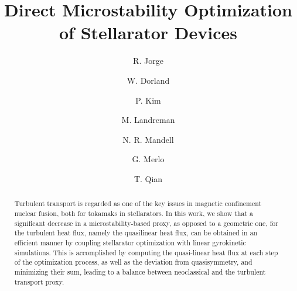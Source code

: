 \documentclass[prl,twocolumn,amsmath,amssymb,showpacs,superscriptaddress]{revtex4-2}
\begin{document}


\title[Direct Microstability Optimization of Stellarator Devices]{Direct Microstability Optimization of Stellarator Devices}

\author{R. Jorge}
\address{Instituto de Plasmas e Fusão Nuclear, Instituto Superior Técnico, Universidade de Lisboa, 1049-001 Lisboa, Portugal}
\address{Department of Physics, University of Wisconsin-Madison, Madison, Wisconsin 53706, USA}

\author{W. Dorland}
\address{Department of Physics, University of Maryland, College Park, MD 20742, USA}
\address{Institute for Research in Electronics and Applied Physics, University of Maryland, College Park, MD 20742, USA}
\address{Princeton Plasma Physics Laboratory, Princeton, NJ 08543, USA}

\author{P. Kim}
\address{Department of Physics, University of Maryland, College Park, MD 20742, USA}

\author{M. Landreman}
\address{Institute for Research in Electronics and Applied Physics,
University of Maryland, College Park, MD 20742, USA}

\author{N. R. Mandell}
\address{Princeton Plasma Physics Laboratory, Princeton, NJ 08543, USA}

\author{G. Merlo}
\address{Oden Institute for Computational Engineering and Sciences, The University of Texas at Austin, Austin, TX 78712, United States of America}

\author{T. Qian}
\address{Princeton Plasma Physics Laboratory, Princeton, NJ 08543, USA}

\begin{abstract}
Turbulent transport is regarded as one of the key issues in magnetic confinement nuclear fusion, both for tokamaks in stellarators.
In this work, we show that a significant decrease in {a microstability-based proxy, as opposed to a geometric one, for the} turbulent heat flux{, namely the quasilinear heat flux,} can be obtained in an efficient manner by coupling stellarator optimization with linear gyrokinetic simulations.
This is accomplished by computing the quasi-linear heat flux at each step of the optimization process, as well as the deviation from quasisymmetry, and minimizing their sum, leading to a balance between neoclassical and {the} turbulent transport {proxy}.
\end{abstract}
\end{document}
